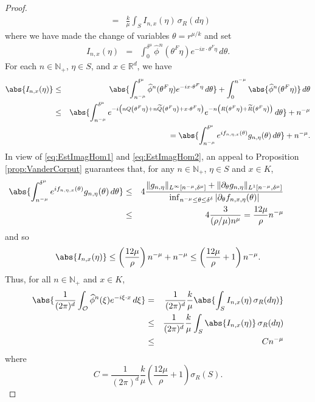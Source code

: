 \documentclass[11pt, letter]{book}
\newcommand{\f}[2]{\frac{#1}{#2}}
\begin{document}
\begin{proof}
\begin{eqnarray*}
    &=&
    \frac{k}{\mu}\int_S I_{n,x}(\eta)\,\sigma_R(d\eta)
\end{eqnarray*}
where we have made the change of variables $\theta=r^{\mu/ k}$ and set
\begin{eqnarray*}
    I_{n,x}(\eta)&=&\int_0^{\delta^{\mu}}\widehat{\phi}^n(\theta^F\eta)e^{-ix\cdot\theta^F\eta}\,d\theta.
\end{eqnarray*}
For each $n\in\mathbb{N}_+$, $\eta\in S$, and $x\in\mathbb{R}^d$, we have
\begin{eqnarray*}
\abs{I_{n,x}(\eta)}
&\leq & 
\abs{\int_{n^{-\mu}}^{\delta^{\mu}}\widehat{\phi}^n(\theta^F\eta)e^{-ix\cdot\theta^F\eta}\,d\theta} +\int_{0}^{n^{-\mu}}\abs{\widehat{\phi}^n(\theta^F\eta)}\,d\theta\\
&\leq& \abs{\int_{n^{-\mu}}^{\delta^\mu} e^{-i\left(nQ\left(\theta^F\eta\right)+n\widetilde{Q}\left(\theta^F\eta\right)+x\cdot\theta^F\eta\right)}e^{-n\left(R\left(\theta^F\eta\right)+\widetilde{R}\left(\theta^F\eta\right)\right)}\,d\theta}+n^{-\mu}\\
& &\hspace{1cm}=\abs{\int_{n^{-\mu}}^{\delta^\mu} e^{i f_{n,\eta,x}(\theta) } g_{n,\eta}(\theta)\,d\theta} 
+ n^{-\mu}.
\end{eqnarray*}
In view of \eqref{eq:EstImagHom1} and \eqref{eq:EstImagHom2}, an appeal to Proposition \ref{prop:VanderCorput} guarantees that, for any $n\in\mathbb{N}_+$, $\eta\in S$ and $x\in K$,
\begin{eqnarray*}
 \hspace{-1cm}\abs{\int_{n^{-\mu}}^{\delta^\mu}e^{if_{n,\eta,x}(\theta)}g_{n,\eta}(\theta)\,d\theta}
    &\leq& 
    4
    \frac{ 
    \|g_{n,\eta}\|_{L^\infty[n^{-\mu},\delta^{\mu}]}
    +
    \|\partial_{\theta}g_{n,\eta}\|_{L^1[n^{-\mu},\delta^{\mu}]}
    }{
    \inf_{n^{-\mu}\leq\theta\leq \delta^{\delta}}|\partial_{\theta}f_{n,x,\eta}(\theta)|
    }\\
    &\leq& 4\frac{3}{(\rho/\mu) n^{\mu}}=\frac{12\mu}{\rho}n^{-\mu}
\end{eqnarray*}
and so
\begin{equation*}
    \abs{I_{n,x}(\eta)}\leq \left(\frac{12\mu}{\rho}\right)n^{-\mu}+n^{-\mu}\leq \left(\frac{12\mu}{\rho}+1\right)n^{-\mu}.
\end{equation*}
Thus, for all $n\in\mathbb{N}_+$ and $x\in K$,
\begin{eqnarray*}
\abs{\f{1}{(2\pi)^d}\int_{\mathcal{O}}\widehat{\phi}^n(\xi)e^{-i\xi\cdot x}\,d\xi}
&=&\frac{1}{(2\pi)^d}\f{k}{\mu}\abs{\int_S I_{n,x}(\eta)\,\sigma_R(d\eta)} \\
&\leq& \frac{1}{(2\pi)^d}\f{k}{\mu}\int_S \abs{I_{n,x}(\eta)}\,\sigma_R(d\eta)\\
&\leq& Cn^{-\mu}
\end{eqnarray*}
where
\begin{equation*}
    C=\f{1}{(2\pi)^d} \f{k}{\mu} \left(\frac{12\mu}{\rho}+1\right)\sigma_R(S).
\end{equation*}
\end{proof}
\end{document}
